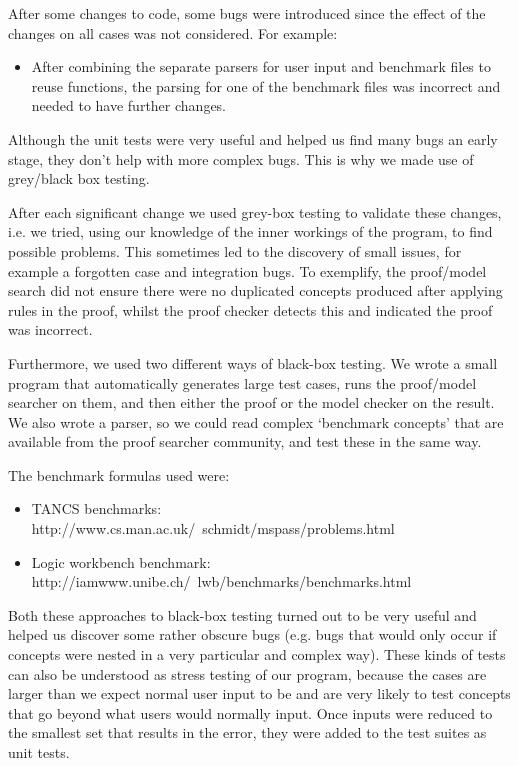 After some changes to code, some bugs were introduced since the effect of the changes on all cases was not considered. For example:

\begin{itemize}
\item After combining the separate parsers for user input and benchmark files to reuse functions, the parsing for one of the benchmark files was incorrect and needed to have further changes.
\end{itemize}

Although the unit tests were very useful and helped us find many bugs an early stage, they don't help with more complex bugs. This is why we made use of grey/black box testing.

After each significant change we used grey-box testing to validate these changes, i.e. we tried, using our knowledge of the inner workings of the program, to find possible problems. This sometimes led to the discovery of small issues, for example a forgotten case and integration bugs. To exemplify, the proof/model search did not ensure there were no duplicated concepts produced after applying rules in the proof, whilst the proof checker detects this and indicated the proof was incorrect.

Furthermore, we used two different ways of black-box testing. We wrote a small program that automatically generates large test cases, runs the proof/model searcher on them, and then either the proof or the model checker on the result. We also wrote a parser, so we could read complex `benchmark concepts' that are available from the proof searcher community, and test these in the same way.

The benchmark formulas used were:
\begin{itemize}
\item TANCS benchmarks:
http://www.cs.man.ac.uk/~schmidt/mspass/problems.html
\item Logic workbench benchmark:
http://iamwww.unibe.ch/~lwb/benchmarks/benchmarks.html
\end{itemize}

Both these approaches to black-box testing turned out to be very useful and helped us discover some rather obscure bugs (e.g. bugs that would only occur if concepts were nested in a very particular and complex way). These kinds of tests can also be understood as stress testing of our program, because the cases are larger than we expect normal user input to be and are very likely to test concepts that go beyond what users would normally input. Once inputs were reduced to the smallest set that results in the error, they were added to the test suites as unit tests.

